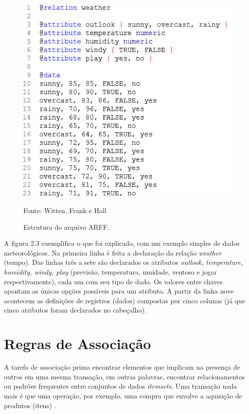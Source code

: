 \documentclass[tg]{mdtufsm}
\begin{document}
\begin{figure}[!htb]
	\centering
	\includegraphics[scale=1]{images/arff.png}
	\caption{Estrutura do arquivo ARFF.} 
	\small{Fonte: Witten, Frank e Hall \citeyearpar{witten-hall}}
\end{figure}

A figura 2.3 exemplifica o que foi explicado, com um exemplo simples de dados meteorológicos. Na primeira linha é feita a declaração da relação \textit{weather} (tempo). Das linhas três a sete são declarados os atributos \textit{outlook, temperature, humidity, windy, play} (previsão, temperatura, umidade, ventoso e jogar respectivamente), cada um com seu tipo de dado. Os valores entre chaves apontam as únicas opções possíveis para um atributo. A partir da linha nove acontecem as definições de registros (dados) compostas por cinco colunas (já que cinco atributos foram declarados no cabeçalho).

\section{Regras de Associação}

A tarefa de associação prima encontrar elementos que implicam na presença de outros em uma mesma transação, em outras palavras, encontrar relacionamentos ou padrões frequentes entre conjuntos de dados \textit{itemsets}. Uma transação nada mais é que uma operação, por exemplo, uma compra que envolve a aquisição de produtos (itens) \cite{vasconcelos}.
\end{document}
